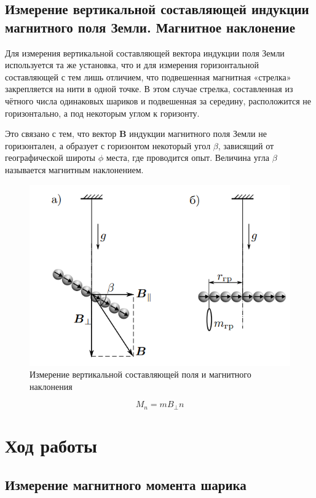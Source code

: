 \subsection{Измерение вертикальной составляющей индукции магнитного поля Земли. Магнитное наклонение}

Для измерения вертикальной составляющей вектора индукции поля Земли используется та же установка, что и для измерения горизонтальной составляющей с тем лишь отличием, что подвешенная магнитная «стрелка» закрепляется на нити в одной точке. В этом случае стрелка, составленная из чётного числа одинаковых шариков и подвешенная за середину, расположится не горизонтально, а под некоторым углом к горизонту.

Это связано с тем, что вектор $\textbf{B}$ индукции магнитного поля Земли не горизонтален, а образует с горизонтом
некоторый угол $\beta$, зависящий от географической широты $\phi$ места, где проводится опыт. Величина угла $\beta$ называется магнитным наклонением.

\begin{figure}[h]
    \centering
    \includegraphics[width = 10 cm]{images/3.png}
    \caption{Измерение вертикальной составляющей поля и магнитного наклонения}
    \label{way3}
\end{figure}

\begin{equation}
    M_n = m B_{\perp} n
\end{equation}

\section{Ход работы}

\subsection{Измерение магнитного момента шарика}

